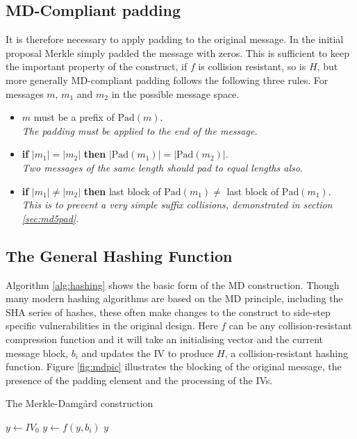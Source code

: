 \documentclass[a4paper,12pt]{article}
\newcommand{\Pad}{\text{Pad}}
\begin{document}
\subsection{MD-Compliant padding}
It is therefore necessary to apply padding to the original message. In the initial proposal Merkle simply padded the message with zeros\cite{Merkle1979}. This is sufficient to keep the important property of the construct, if $f$ is collision resistant, so is $H$, but more generally MD-compliant padding follows the following three rules. For messages $m$, $m_1$ and $m_2$ in the possible message space.
\begin{itemize}
    \item $m$ must be a prefix of $\Pad(m)$.\\\emph{The padding must be applied to the end of the message.}
    \item \textbf{if} $|m_1| = |m_2|$ \textbf{then} $|\Pad(m_1)| = |\Pad(m_2)|$.\\\emph{Two messages of the same length should pad to equal lengths also.}
    \item \textbf{if} $|m_1| \neq |m_2|$ \textbf{then} last block of $\Pad(m_1) \neq$ last block of $\Pad(m_1)$.\\\emph{This is to prevent a very simple suffix collisions, demonstrated in section \ref{sec:md5pad}.}
\end{itemize}

\subsection{The General Hashing Function}
Algorithm \ref{alg:hashing} shows the basic form of the MD construction. Though many modern hashing algorithms are based on the MD principle, including the SHA series \cite{fips} of hashes, these often make changes to the construct to side-step specific vulnerabilities in the original design. Here $f$ can be any collision-resistant compression function and it will take an initialising vector and the current message block, $b_i$ and updates the IV to produce $H$, a collision-resistant hashing function. Figure \ref{fig:mdpic} illustrates the blocking of the original message, the presence of the padding element and the processing of the IVs.

\begin{algorithm}
    \caption{The Merkle-Damg\r{a}rd construction}
    \label{alg:hashing}
\begin{algorithmic}
        \State $y \gets IV_0$  
            \State $y \gets f(y, b_i)$
        \EndFor
        \State \Return $y$
    \EndFunction
\end{algorithmic}
\end{algorithm}
\end{document}
